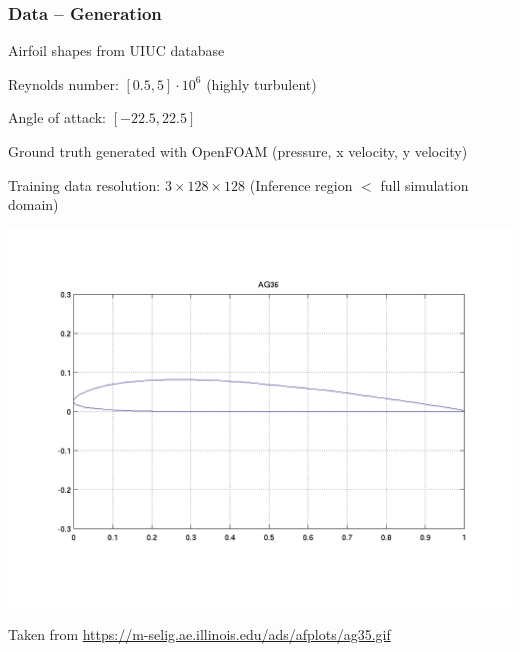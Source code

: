 
\begin{frame}
    \frametitle{Data -- Generation}

\vspace*{1cm}
\begin{multicols}{2}
	\begin{PraesentationAufzaehlung}
	
	\item Airfoil shapes from UIUC database

    \item Reynolds number: $[0.5, 5] \cdot 10^6$ (highly turbulent)

    \item Angle of attack: $[-22.5, 22.5]$

    \item Ground truth generated with OpenFOAM \newline (pressure, x velocity, y velocity)
    
    \item Training data resolution: $3\times 128 \times 128$ \newline (Inference region $<$ full simulation domain)
    \end{PraesentationAufzaehlung}
    \vfill\columnbreak
    \includegraphics[width=\columnwidth, height=.6\textheight]{./Ressourcen/Praesentation/Bilder/uiuc_sample.png}
    
\end{multicols}
	\vspace*{-1.4cm}
    Taken from \url{https://m-selig.ae.illinois.edu/ads/afplots/ag35.gif}
\end{frame}
\clearpage